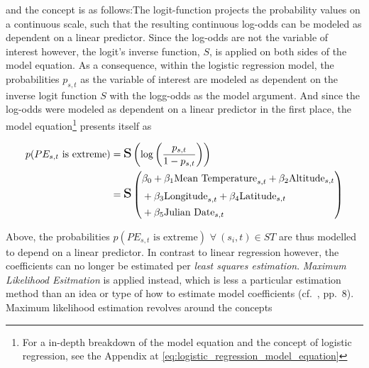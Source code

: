 \documentclass[
  12pt,
]{article}
\begin{document}
and the concept is as follows:\newline The logit-function projects the
probability values on a continuous scale, such that the resulting
continuous log-odds can be modeled as dependent on a linear predictor.
Since the log-odds are not the variable of interest however, the logit's
inverse function, \(S\), is applied on both sides of the model equation.
As a consequence, within the logistic regression model, the
probabilities \(p_{s,t}\) as the variable of interest are modeled as
dependent on the inverse logit function \(S\) with the logg-odds as the
model argument. And since the log-odds were modeled as dependent on a
linear predictor in the first place, the model
equation\footnote{For a in-depth breakdown of the model equation and the concept of logistic regression, see the Appendix at \ref{eq:logistic_regression_model_equation}}
presents itself as

\begin{mdframed}[leftline = true, rightline = true, bottomline = false, topline = false, frametitle={Logistic Regression Model Equation}]
\begin{equation}\label{eq:logistic_regression_model_equation}
\begin{split}
p(PE_{s,t} \textrm{ is extreme}) &=
\scalebox{2}{s}\left(\log\left(\frac{p_{s,t}}{1-p_{s,t}}\right)\right) \\
&= \scalebox{2}{s} \left(
\begin{aligned}
& \beta_0 + \vphantom{\sum} \beta_1 \textrm{Mean Temperature}_{s,t} + \beta_2 \textrm{Altitude}_{s,t} \\
& + \beta_3 \textrm{Longitude}_{s,t} + \beta_4 \textrm{Latitude}_{s,t} \\
& + \beta_5 \textrm{Julian Date}_{s,t}
\end{aligned}
\right)
\end{split}
\end{equation}
\end{mdframed}

Above, the probabilities \(p(PE_{s,t} \textrm{ is extreme})\)
\(\forall\:(s_{i},t)\in ST\) are thus modelled to depend on a linear
predictor. In contrast to linear regression however, the coefficients
can no longer be estimated per \textit{least squares estimation}.
\textit{Maximum Likelihood Esitmation} is applied instead, which is less
a particular estimation method than an idea or type of how to estimate
model coefficients (cf.~\cite{Hosmer.2013}, pp.~8). Maximum likelihood
estimation revolves around the concepts
\end{document}
